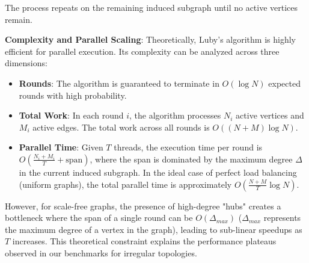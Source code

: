\documentclass{article}
\begin{document}
The process repeats on the remaining induced subgraph until no active vertices remain. 

\textbf{Complexity and Parallel Scaling}: 
Theoretically, Luby's algorithm is highly efficient for parallel execution. Its complexity can be analyzed across three dimensions:
\begin{itemize}
    \item \textbf{Rounds}: The algorithm is guaranteed to terminate in $O(\log N)$ expected rounds with high probability.
    \item \textbf{Total Work}: In each round $i$, the algorithm processes $N_i$ active vertices and $M_i$ active edges. The total work across all rounds is $O((N+M) \log N)$.
    \item \textbf{Parallel Time}: Given $T$ threads, the execution time per round is $O(\frac{N_i + M_i}{T} + \text{span})$, where the span is dominated by the maximum degree $\Delta$ in the current induced subgraph. In the ideal case of perfect load balancing (uniform graphs), the total parallel time is approximately $O(\frac{N+M}{T} \log N)$.
\end{itemize}

However, for scale-free graphs, the presence of high-degree "hubs" creates a bottleneck where the span of a single round can be $O(\Delta_{max})$ ($\Delta_{max}$ represents the maximum degree of a vertex in the graph), leading to sub-linear speedups as $T$ increases. This theoretical constraint explains the performance plateaus observed in our benchmarks for irregular topologies.
\end{document}
